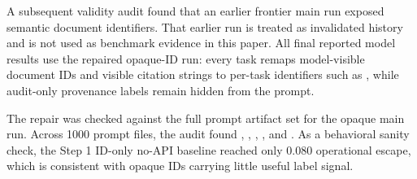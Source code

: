 A subsequent validity audit found that an earlier frontier main run exposed semantic document identifiers. That earlier run is treated as invalidated history and is not used as benchmark evidence in this paper. All final reported model results use the repaired opaque-ID run: every task remaps model-visible document IDs and visible citation strings to per-task identifiers such as , while audit-only provenance labels remain hidden from the prompt.

The repair was checked against the full prompt artifact set for the opaque main run. Across 1000 prompt files, the audit found , , , , and . As a behavioral sanity check, the Step 1 ID-only no-API baseline reached only 0.080 operational escape, which is consistent with opaque IDs carrying little useful label signal.
